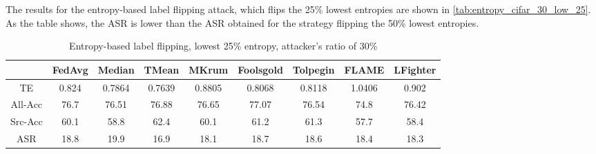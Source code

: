 The results for the entropy-based label flipping attack, which flips the 25\% lowest entropies are shown in \autoref{tab:entropy_cifar_30_low_25}. As the table shows, the ASR is lower than the ASR obtained for the strategy flipping the 50\% lowest entropies.

\begin{table}[h!]
        \centering
        \small
        \begin{adjustbox}{center}
        \begin{tabular}{|c|c|c|c|c|c|c|c|c|}
            \hline
            & FedAvg & Median & TMean & MKrum & Foolsgold & Tolpegin & FLAME & LFighter \\
            \hline
            TE & 0.824 & 0.7864 & 0.7639 & 0.8805 & 0.8068 & 0.8118 & 1.0406 & 0.902 \\
            \hline
            All-Acc & 76.7 & 76.51 & 76.88 & 76.65 & 77.07 & 76.54 & 74.8 & 76.42 \\
            \hline
            Src-Acc & 60.1 & 58.8 & 62.4 & 60.1 & 61.2 & 61.3 & 57.7 & 58.4 \\
            \hline
            ASR & 18.8 & 19.9 & 16.9 & 18.1 & 18.7 & 18.6 & 18.4 & 18.3 \\
            \hline
        \end{tabular}
        \end{adjustbox}
        \caption{Entropy-based label flipping, lowest 25\% entropy, attacker's ratio of 30\%}
        \label{tab:entropy_cifar_30_low_25}
    \end{table}

